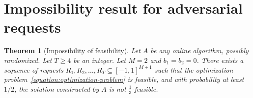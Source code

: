 \documentclass[12pt]{article}
\newtheorem{theorem}{Theorem}
\theoremstyle{definition}
\begin{document}
\appendix

\section{Impossibility result for adversarial requests}
\label{section:impossibility-result}

\begin{theorem}[Impossibility of feasibility]
Let $A$ be any online algorithm, possibly randomized. Let $T \ge 4$ be an
integer. Let $M=2$ and $b_1 = b_2 = 0$. There exists a sequence of requests
$R_1, R_2, \dots, R_T \subseteq [-1,1]^{M+1}$ such that the optimization
problem~\eqref{equation:optimization-problem} is feasible, and with probability
at least $1/2$, the solution constructed by $A$ is not $\frac{1}{3}$-feasible.
\end{theorem}
\end{document}
